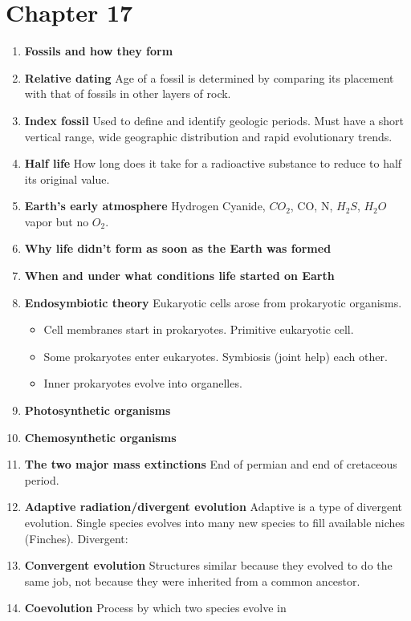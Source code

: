 \documentclass[9pt]{article}
\begin{document}
\section*{Chapter 17}
\begin{enumerate}
  \item {\bf Fossils and how they form}
  \item {\bf Relative dating} Age of a fossil is determined by
    comparing its placement with that of fossils in other layers of
    rock.
  \item {\bf Index fossil} Used to define and identify geologic
    periods. Must have a short vertical range, wide geographic
    distribution and rapid evolutionary trends.
  \item  {\bf Half  life}  How long  does it  take  for a  radioactive
    substance to reduce to half its original value.
  \item {\bf Earth's early atmosphere} Hydrogen Cyanide, $CO_2$, CO, N,
    $H_2S$, $H_2O$ vapor but no $O_2$.
  \item {\bf Why life didn't form as soon as the Earth was formed}
  \item {\bf When and under what conditions life started on Earth}
  \item {\bf Endosymbiotic theory} Eukaryotic cells arose from
    prokaryotic organisms.
    \begin{itemize}
    \item Cell membranes start in prokaryotes. Primitive eukaryotic cell.
    \item Some prokaryotes enter eukaryotes. Symbiosis (joint help) each other.
    \item Inner prokaryotes evolve into organelles.
    \end{itemize}
  \item {\bf Photosynthetic organisms}
  \item {\bf Chemosynthetic organisms}
  \item {\bf The two major mass extinctions} End of permian and end of
    cretaceous period.
  \item {\bf Adaptive radiation/divergent evolution} Adaptive is a
    type of divergent evolution. Single species evolves into many
    new species to fill available niches (Finches). Divergent:
  \item {\bf Convergent evolution} Structures similar because they
    evolved to do the same job, not because they were inherited from a
    common ancestor.
  \item {\bf Coevolution} Process by which two species evolve in

\end{enumerate}
\end{document}
